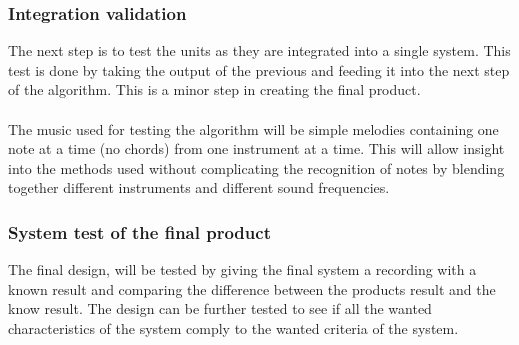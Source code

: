 \subsubsection{Integration validation}
The next step is to test the units as they are integrated into a single system.
This test is done by taking the output of the previous and feeding it into the next step of the algorithm. 
This is a minor step in creating the final product.
\\\\
The music used for testing the algorithm will be simple melodies containing one note at a time (no chords) from one instrument at a time. This will allow insight into the methods used without complicating the recognition of notes by blending together different instruments and different sound frequencies.

\subsubsection{System test of the final product}
The final design, will be tested by giving the final system a recording with a known result and comparing the difference between the products result and the know result. The design can be further tested to see if all the wanted characteristics of the system comply to the wanted criteria of the system.


